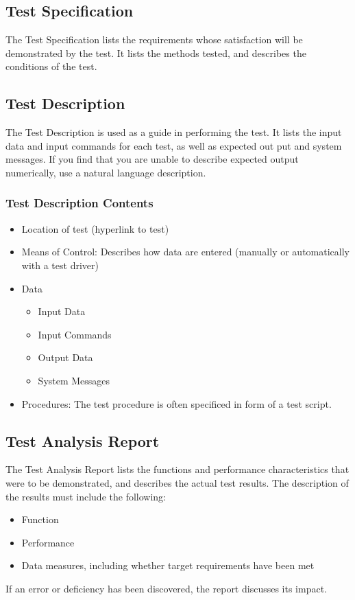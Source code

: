 \documentclass[a4paper, draft]{article}
\begin{document}
\subsection{Test Specification}
The Test Specification lists the requirements whose satisfaction will be demonstrated by the test. It lists the methods tested, and describes the conditions of the test.

\subsection{Test Description}
The Test Description is used as a guide in performing the test. It lists the input data and input commands for each test, as well as expected out put and system messages.
If you find that you are unable to describe expected output numerically, use a natural language description.

\subsubsection{Test Description Contents}
\begin{itemize}
    \item Location of test (hyperlink to test)
    \item Means of Control: Describes how data are entered (manually or automatically with a test driver)
    \item Data
          \begin{itemize}
              \item Input Data
              \item Input Commands
              \item Output Data
              \item System Messages
          \end{itemize}
    \item Procedures: The test procedure is often specificed in form of a test script.
\end{itemize}

\subsection{Test Analysis Report}
The Test Analysis Report lists the functions and performance characteristics that were to be demonstrated, and describes the actual test results. The description of the results must include the following:
\begin{itemize}
    \item Function
    \item Performance
    \item Data measures, including whether target requirements have been met
\end{itemize}
If an error or deficiency has been discovered, the report discusses its impact.
\end{document}
